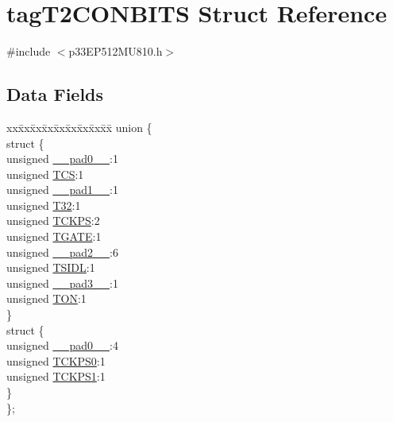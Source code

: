 \hypertarget{structtag_t2_c_o_n_b_i_t_s}{}\section{tag\+T2\+C\+O\+N\+B\+I\+TS Struct Reference}
\label{structtag_t2_c_o_n_b_i_t_s}


{\ttfamily \#include $<$p33\+E\+P512\+M\+U810.\+h$>$}

\subsection*{Data Fields}
\begin{DoxyCompactItemize}
\item 
\begin{tabbing}
xx\=xx\=xx\=xx\=xx\=xx\=xx\=xx\=xx\=\kill
union \{\\
\>struct \{\\
\>\>unsigned \hyperlink{structtag_t2_c_o_n_b_i_t_s_adf71f3d8410c1f1dbbc96680a92c49af}{\_\_pad0\_\_}:1\\
\>\>unsigned \hyperlink{structtag_t2_c_o_n_b_i_t_s_ab4daee3a10870ffba1c86d5020adb9b4}{TCS}:1\\
\>\>unsigned \hyperlink{structtag_t2_c_o_n_b_i_t_s_acaf2d0924a107ec6e8d2e31febaf66f9}{\_\_pad1\_\_}:1\\
\>\>unsigned \hyperlink{structtag_t2_c_o_n_b_i_t_s_a3bb4354090702842f0789980bb1cd45c}{T32}:1\\
\>\>unsigned \hyperlink{structtag_t2_c_o_n_b_i_t_s_a0d455d68434019feaabe9dfb64d75552}{TCKPS}:2\\
\>\>unsigned \hyperlink{structtag_t2_c_o_n_b_i_t_s_a35b6e4b591a8bd20e026168399eb0e6a}{TGATE}:1\\
\>\>unsigned \hyperlink{structtag_t2_c_o_n_b_i_t_s_a4d97cc5f7d51d22fc2bf3eab35c9cb7f}{\_\_pad2\_\_}:6\\
\>\>unsigned \hyperlink{structtag_t2_c_o_n_b_i_t_s_a4971b881615ef42703b5b78179fcda3d}{TSIDL}:1\\
\>\>unsigned \hyperlink{structtag_t2_c_o_n_b_i_t_s_ad7d7cee33e0c7f447abc4d171c628dd4}{\_\_pad3\_\_}:1\\
\>\>unsigned \hyperlink{structtag_t2_c_o_n_b_i_t_s_a8c2a094047d1019ce1c5b25ea8cff9b3}{TON}:1\\
\>\} \\
\>struct \{\\
\>\>unsigned \hyperlink{structtag_t2_c_o_n_b_i_t_s_adf71f3d8410c1f1dbbc96680a92c49af}{\_\_pad0\_\_}:4\\
\>\>unsigned \hyperlink{structtag_t2_c_o_n_b_i_t_s_a5cd4ef74604f5d88289a53f41cf38b7e}{TCKPS0}:1\\
\>\>unsigned \hyperlink{structtag_t2_c_o_n_b_i_t_s_ae190f2375c403c9fe8f5eb62a5bdf200}{TCKPS1}:1\\
\>\} \\
\}; \\

\end{tabbing}\end{DoxyCompactItemize}


